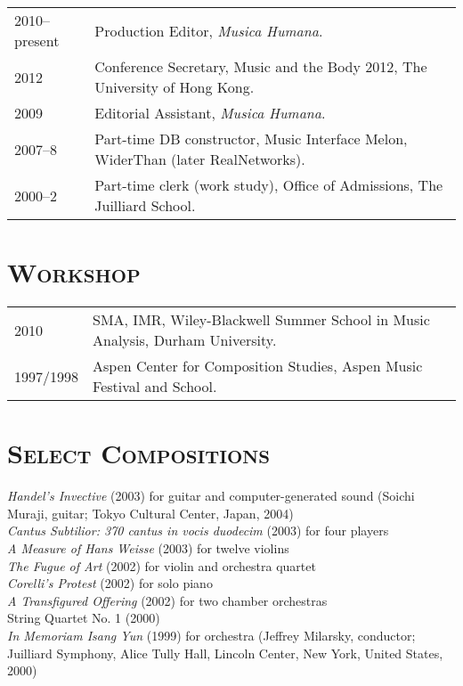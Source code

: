 \documentclass[a4paper,11pt]{article}
\begin{document}
  \hspace*{-0.25cm}
  \begin{tabular}{p{2.5cm} l}
    2010--present & Production Editor, \textit{Musica Humana}.\\
    2012 & Conference Secretary, Music and the Body 2012, The University of Hong Kong.\\
    2009 & Editorial Assistant, \textit{Musica Humana}.\\
    2007--8 & Part-time DB constructor, Music Interface Melon, WiderThan (later RealNetworks).\\
    2000–2 & Part-time clerk (work study), Office of Admissions, The Juilliard School.
  \end{tabular}
  
  \vspace{2.5mm}
  
  \section*{\textsc{Workshop}}
  
  \hspace*{-0.25cm}
  \begin{tabular}{p{2.5cm} l}
    2010 & SMA, IMR, Wiley-Blackwell Summer School in Music Analysis, Durham University.\\
    1997/1998 & Aspen Center for Composition Studies, Aspen Music Festival and School.
  \end{tabular}
  
  \vspace{2.5mm}
  
  \section*{\textsc{Select Compositions}}
  
  \begin{hangparas}{15pt}{1}
    \textit{Handel’s Invective} (2003) for guitar and computer-generated sound (Soichi Muraji, guitar; Tokyo Cultural Center, Japan, 2004)\\[2mm]
  
    \textit{Cantus Subtilior: 370 cantus in vocis duodecim} (2003) for four players\\[2mm]
  
    \textit{A Measure of Hans Weisse} (2003) for twelve violins\\[2mm]
  
    \textit{The Fugue of Art} (2002) for violin and orchestra quartet\\[2mm]
  
    \textit{Corelli’s Protest} (2002) for solo piano\\[2mm]
  
    \textit{A Transfigured Offering} (2002) for two chamber orchestras\\[2mm]
  
    String Quartet No. 1 (2000)\\[2mm]
  
    \textit{In Memoriam Isang Yun} (1999) for orchestra (Jeffrey Milarsky, conductor; Juilliard Symphony, Alice Tully Hall, Lincoln Center, New York, United States, 2000)
  \end{hangparas}
  
\end{document}
